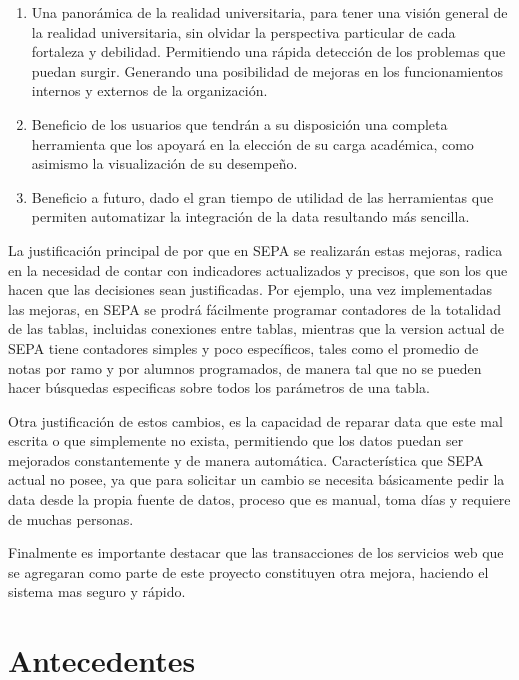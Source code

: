 \documentclass[a4paper,12pt,openany,oneside]{book}
\begin{document}
\begin{enumerate}
\item Una panorámica de la realidad universitaria, para tener una visión general de la realidad universitaria, sin olvidar la perspectiva particular de cada fortaleza y debilidad. Permitiendo una rápida detección de los problemas que puedan surgir. Generando una posibilidad de mejoras en los funcionamientos internos y externos de la organización.

\item Beneficio de los usuarios que tendrán a su disposición una completa herramienta que los apoyará en la elección de su carga académica, como asimismo la visualización de su desempeño.

\item Beneficio a futuro, dado el gran tiempo de utilidad de las herramientas que permiten automatizar la integración de la data resultando más sencilla.
\end{enumerate}

La justificación principal de por que en SEPA se realizarán estas mejoras, radica en la necesidad de contar con indicadores actualizados y precisos, que son los que hacen que las decisiones sean justificadas. Por ejemplo, una vez implementadas las mejoras, en SEPA se prodrá fácilmente programar contadores de la totalidad de las tablas, incluidas conexiones entre tablas, mientras que la version actual de SEPA tiene contadores simples y poco específicos, tales como el promedio de notas por ramo y por alumnos programados, de manera tal que no se pueden hacer búsquedas especificas sobre todos los parámetros de una tabla.

Otra justificación de estos cambios, es la capacidad de reparar data que este mal escrita o que simplemente no exista, permitiendo que los datos puedan ser mejorados constantemente y de manera automática. Característica que SEPA actual no posee, ya que para solicitar un cambio se necesita básicamente pedir la data desde la propia fuente de datos, proceso que es manual, toma días y requiere de muchas personas. 

Finalmente es importante destacar que las transacciones de los servicios web que se agregaran como parte de este proyecto constituyen otra mejora, haciendo el sistema mas seguro y rápido.

\chapter{Antecedentes}
\thispagestyle{empty}
\end{document}
